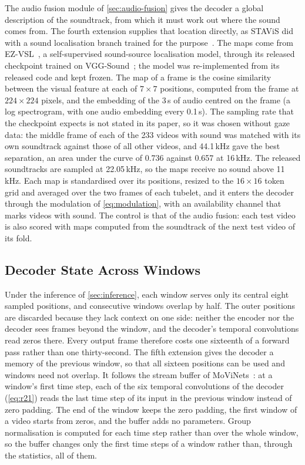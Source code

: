 The audio fusion module of \cref{sec:audio-fusion} gives the decoder a global
description of the soundtrack, from which it must work out where the sound
comes from. The fourth extension supplies that location directly, as STAViS
did with a sound localisation branch trained for the
purpose~\cite{tsiami2020stavis}. The maps come from
EZ-VSL~\cite{mo2022localizing}, a self-supervised sound-source localisation
model, through its released checkpoint trained on
VGG-Sound~\cite{chen2020vggsound}; the model was re-implemented from its
released code and kept frozen. The map of a frame is the cosine similarity
between the visual feature at each of $7\times7$ positions, computed from the
frame at $224\times224$ pixels, and the embedding of the 3\,s of audio centred
on the frame (a log spectrogram, with one audio embedding every 0.1\,s). The
sampling rate that the checkpoint expects is not stated in its paper, so it was
chosen without gaze data: the middle frame of each of the 233 videos with sound
was matched with its own soundtrack against those of all other videos, and
44.1\,kHz gave the best separation, an area under the curve of 0.736 against
0.657 at 16\,kHz. The released soundtracks are sampled at 22.05\,kHz, so the
maps receive no sound above 11\,kHz. Each map is standardised over its
positions, resized to the $16\times16$ token grid and averaged over the two
frames of each tubelet, and it enters the decoder through the modulation of
\cref{eq:modulation}, with an availability channel that marks videos with
sound. The control is that of the audio fusion: each test video is also scored
with maps computed from the soundtrack of the next test video of its fold.

\subsection{Decoder State Across Windows}\label{sec:state}

Under the inference of \cref{sec:inference}, each window serves only its
central eight sampled positions, and consecutive windows overlap by half. The
outer positions are discarded because they lack context on one side: neither
the encoder nor the decoder sees frames beyond the window, and the decoder's
temporal convolutions read zeros there. Every output frame therefore costs one
sixteenth of a forward pass rather than one thirty-second. The fifth extension
gives the decoder a memory of the previous window, so that all sixteen
positions can be used and windows need not overlap. It follows the stream
buffer of MoViNets~\cite{kondratyuk2021movinets}: at a window's first time
step, each of the six temporal convolutions of the decoder (\cref{eq:r21})
reads the last time step of its input in the previous window instead of zero
padding. The end of the window keeps the zero padding, the first window of a
video starts from zeros, and the buffer adds no parameters. Group
normalisation is computed for each time step rather than over the whole
window, so the buffer changes only the first time steps of a window rather
than, through the statistics, all of them.

